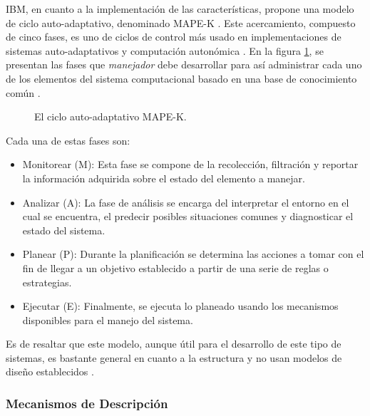 \documentclass[12pt]{article}
\begin{document}

    IBM, en cuanto a la implementación de las características, propone una modelo de ciclo auto-adaptativo, denominado MAPE-K \cite{Krikava2013}. Este acercamiento, compuesto de cinco fases, es uno de ciclos de control más usado en implementaciones de sistemas auto-adaptativos y computación autonómica \cite{Arcaini_2015}. En la figura \ref{fig:mapek}, se presentan las fases que \textit{manejador} debe desarrollar para así administrar cada uno de los elementos del sistema computacional basado en una base de conocimiento común \cite{alessandra_2010}. 

    \begin{figure}[H]
        \centering
        
        \caption{El ciclo auto-adaptativo MAPE-K.} \cite{alessandra_2010}
        \label{fig:mapek}
    \end{figure}

    Cada una de estas fases son:

    \begin{itemize}
        \item Monitorear (M): Esta fase se compone de la recolección, filtración y reportar la información adquirida sobre el estado del elemento a manejar.
        \item Analizar (A): La fase de análisis se encarga del interpretar el entorno en el cual se encuentra, el predecir posibles situaciones comunes y diagnosticar el estado del sistema.
        \item Planear (P): Durante la planificación se determina las acciones a tomar con el fin de llegar a un objetivo establecido a partir de una serie de reglas o estrategias.
        \item Ejecutar (E): Finalmente, se ejecuta lo planeado usando los mecanismos disponibles para el manejo del sistema. 
    \end{itemize}

    Es de resaltar que este modelo, aunque útil para el desarrollo de este tipo de sistemas, es bastante general en cuanto a la estructura y no usan modelos de diseño establecidos \cite{Ouareth_2018}. 

    \subsubsection*{Mecanismos de Descripción}
\end{document}
